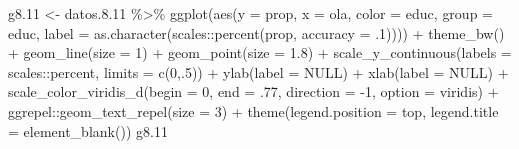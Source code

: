 \documentclass[
  12pt,
]{book}
\newenvironment{Shaded}{\begin{snugshade}}{\end{snugshade}}
\newcommand{\AttributeTok}[1]{\textcolor[rgb]{0.77,0.63,0.00}{#1}}
\newcommand{\ConstantTok}[1]{\textcolor[rgb]{0.00,0.00,0.00}{#1}}
\newcommand{\DecValTok}[1]{\textcolor[rgb]{0.00,0.00,0.81}{#1}}
\newcommand{\FloatTok}[1]{\textcolor[rgb]{0.00,0.00,0.81}{#1}}
\newcommand{\FunctionTok}[1]{\textcolor[rgb]{0.00,0.00,0.00}{#1}}
\newcommand{\NormalTok}[1]{#1}
\newcommand{\OtherTok}[1]{\textcolor[rgb]{0.56,0.35,0.01}{#1}}
\newcommand{\SpecialCharTok}[1]{\textcolor[rgb]{0.00,0.00,0.00}{#1}}
\newcommand{\StringTok}[1]{\textcolor[rgb]{0.31,0.60,0.02}{#1}}
\begin{document}
\begin{Shaded}
\begin{Highlighting}[]
\NormalTok{g8}\FloatTok{.11} \OtherTok{\textless{}{-}}\NormalTok{ datos.}\FloatTok{8.11} \SpecialCharTok{\%\textgreater{}\%} 
  \FunctionTok{ggplot}\NormalTok{(}\FunctionTok{aes}\NormalTok{(}\AttributeTok{y =}\NormalTok{ prop, }\AttributeTok{x =}\NormalTok{ ola, }\AttributeTok{color =}\NormalTok{ educ, }\AttributeTok{group =}\NormalTok{ educ,}
             \AttributeTok{label =} \FunctionTok{as.character}\NormalTok{(scales}\SpecialCharTok{::}\FunctionTok{percent}\NormalTok{(prop, }\AttributeTok{accuracy =}\NormalTok{ .}\DecValTok{1}\NormalTok{)))) }\SpecialCharTok{+}
  \FunctionTok{theme\_bw}\NormalTok{() }\SpecialCharTok{+}   
  \FunctionTok{geom\_line}\NormalTok{(}\AttributeTok{size =} \DecValTok{1}\NormalTok{) }\SpecialCharTok{+}
  \FunctionTok{geom\_point}\NormalTok{(}\AttributeTok{size =} \FloatTok{1.8}\NormalTok{) }\SpecialCharTok{+}
  \FunctionTok{scale\_y\_continuous}\NormalTok{(}\AttributeTok{labels =}\NormalTok{ scales}\SpecialCharTok{::}\NormalTok{percent,}
                     \AttributeTok{limits =} \FunctionTok{c}\NormalTok{(}\DecValTok{0}\NormalTok{,.}\DecValTok{5}\NormalTok{)) }\SpecialCharTok{+}
  \FunctionTok{ylab}\NormalTok{(}\AttributeTok{label =} \ConstantTok{NULL}\NormalTok{) }\SpecialCharTok{+}
  \FunctionTok{xlab}\NormalTok{(}\AttributeTok{label =} \ConstantTok{NULL}\NormalTok{) }\SpecialCharTok{+}
  \FunctionTok{scale\_color\_viridis\_d}\NormalTok{(}\AttributeTok{begin =} \DecValTok{0}\NormalTok{, }\AttributeTok{end =}\NormalTok{ .}\DecValTok{77}\NormalTok{, }\AttributeTok{direction =} \SpecialCharTok{{-}}\DecValTok{1}\NormalTok{, }\AttributeTok{option =} \StringTok{\textquotesingle{}viridis\textquotesingle{}}\NormalTok{) }\SpecialCharTok{+}
\NormalTok{  ggrepel}\SpecialCharTok{::}\FunctionTok{geom\_text\_repel}\NormalTok{(}\AttributeTok{size =} \DecValTok{3}\NormalTok{) }\SpecialCharTok{+}
  \FunctionTok{theme}\NormalTok{(}\AttributeTok{legend.position =} \StringTok{\textquotesingle{}top\textquotesingle{}}\NormalTok{,}
        \AttributeTok{legend.title =} \FunctionTok{element\_blank}\NormalTok{())}
\NormalTok{g8}\FloatTok{.11}
\end{Highlighting}
\end{Shaded}
\end{document}
